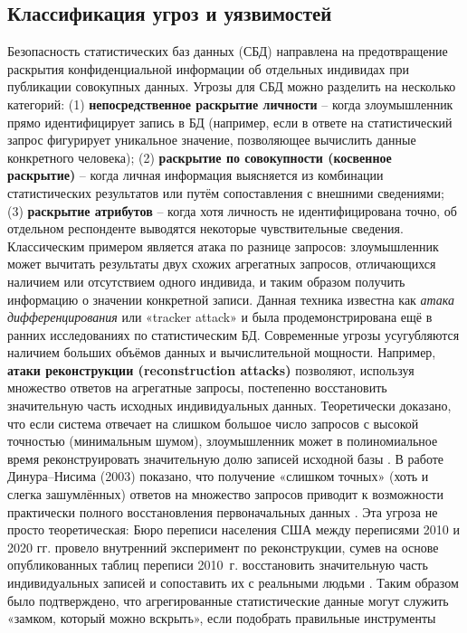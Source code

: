 \subsection{Классификация угроз и уязвимостей}
Безопасность статистических баз данных (СБД) направлена на предотвращение раскрытия конфиденциальной информации об отдельных индивидах при публикации совокупных данных. Угрозы для СБД можно разделить на несколько категорий: (1) \textbf{непосредственное раскрытие личности} – когда злоумышленник прямо идентифицирует запись в БД (например, если в ответе на статистический запрос фигурирует уникальное значение, позволяющее вычислить данные конкретного человека); (2) \textbf{раскрытие по совокупности (косвенное раскрытие)} – когда личная информация выясняется из комбинации статистических результатов или путём сопоставления с внешними сведениями; (3) \textbf{раскрытие атрибутов} – когда хотя личность не идентифицирована точно, об отдельном респонденте выводятся некоторые чувствительные сведения. Классическим примером является атака по разнице запросов: злоумышленник может вычитать результаты двух схожих агрегатных запросов, отличающихся наличием или отсутствием одного индивида, и таким образом получить информацию о значении конкретной записи. Данная техника известна как \textit{атака дифференцирования} или «tracker attack» и была продемонстрирована ещё в ранних исследованиях по статистическим БД. Современные угрозы усугубляются наличием больших объёмов данных и вычислительной мощности. Например, \textbf{атаки реконструкции (reconstruction attacks)} позволяют, используя множество ответов на агрегатные запросы, постепенно восстановить значительную часть исходных индивидуальных данных. Теоретически доказано, что если система отвечает на слишком большое число запросов с высокой точностью (минимальным шумом), злоумышленник может в полиномиальное время реконструировать значительную долю записей исходной базы
\autocite{differentialprivacy-org}
. В работе Динура–Нисима (2003) показано, что получение «слишком точных» (хоть и слегка зашумлённых) ответов на множество запросов приводит к возможности практически полного восстановления первоначальных данных
\autocite{differentialprivacy-org}
. Эта угроза не просто теоретическая: Бюро переписи населения США между переписями 2010 и 2020 гг. провело внутренний эксперимент по реконструкции, сумев на основе опубликованных таблиц переписи 2010~г. восстановить значительную часть индивидуальных записей и сопоставить их с реальными людьми
\autocite{blog-seas-upenn-edu}
. Таким образом было подтверждено, что агрегированные статистические данные могут служить «замком, который можно вскрыть», если подобрать правильные инструменты
